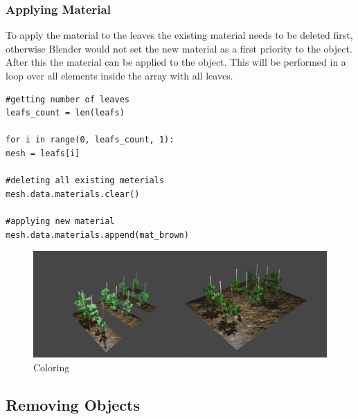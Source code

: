 \subsubsection{Applying Material}
To apply the material to the leaves the existing material needs to be deleted first, otherwise Blender would not set the new material as a first priority to the object. After this the material can be applied to the object. This will be performed in a loop over all elements inside the array with all leaves.

\lstset{language=Python, frame=single}
\begin{lstlisting}
#getting number of leaves
leafs_count = len(leafs)

for i in range(0, leafs_count, 1):
mesh = leafs[i]

#deleting all existing meterials
mesh.data.materials.clear()

#applying new material
mesh.data.materials.append(mat_brown)
\end{lstlisting}


\begin{figure}[h]
\centering
\includegraphics[width=1\textwidth]{coloring.png}
\caption{Coloring}
\label{coloring}
\end{figure}


\subsection{Removing Objects}


